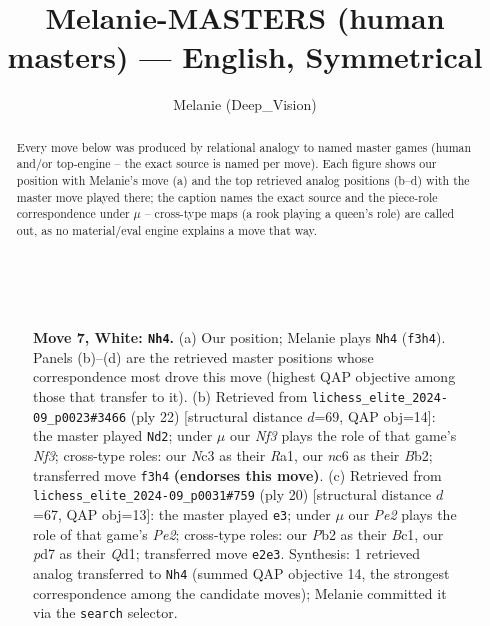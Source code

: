 \documentclass[11pt]{article}
\title{Melanie-MASTERS (human masters) — English, Symmetrical}
\author{Melanie (Deep\_Vision)}
\date{}
\begin{document}
\maketitle

\begin{abstract}Every move below was produced by relational analogy to named master games (human and/or top-engine -- the exact source is named per move). Each figure shows our position with Melanie's move (a) and the top retrieved analog positions (b--d) with the master move played there; the caption names the exact source and the piece-role correspondence under $\mu$ -- cross-type maps (a rook playing a queen's role) are called out, as no material/eval engine explains a move that way.\end{abstract}

\begin{figure}[p]\centering
\begin{subfigure}{0.46\textwidth}\centering
\resizebox{\linewidth}{!}{%
\newchessgame
\chessboard[
  setfen={r1bq1rk1/pp1pppbp/2n2np1/2p5/2P5/2N2NP1/PP1PPPBP/R1BQ1RK1 w - - 4 7},
  showmover=false,
  pgfstyle=straightmove, color=movearrow, markmove={f3-h4}
]}
\caption{}
\end{subfigure}\hfill
\begin{subfigure}{0.46\textwidth}\centering
\resizebox{\linewidth}{!}{%
\newchessgame
\chessboard[
  setfen={r1bq1rk1/1pp1bppp/4pn2/nN1p4/P2P4/5NP1/1BP1PPBP/R2Q1RK1 w - - 3 12},
  showmover=false,
  pgfstyle=straightmove, color=movearrow, markmove={f3-d2}
]}
\caption{}
\end{subfigure}
\\[4pt]
\begin{subfigure}{0.46\textwidth}\centering
\resizebox{\linewidth}{!}{%
\newchessgame
\chessboard[
  setfen={r1bq1rk1/pp2ppbp/1nn3p1/3p4/3P4/2N2NP1/PP2PPBP/R1BQ1RK1 w - - 2 11},
  showmover=false,
  pgfstyle=straightmove, color=movearrow, markmove={e2-e3}
]}
\caption{}
\end{subfigure}\hfill

\caption{\textbf{Move 7, White: \texttt{Nh4}.} (a) Our position; Melanie plays \texttt{Nh4} (\texttt{f3h4}). Panels (b)--(d) are the retrieved master positions whose correspondence most drove this move (highest QAP objective among those that transfer to it). (b) Retrieved from \texttt{lichess\_elite\_2024-09\_p0023\#3466} (ply 22) [structural distance $d$=69, QAP obj=14]: the master played \texttt{Nd2}; under $\mu$ our \emph{Nf3} plays the role of that game's \emph{Nf3}; cross-type roles: our \emph{N}c3 as their \emph{R}a1, our \emph{n}c6 as their \emph{B}b2; transferred move \texttt{f3h4} \textbf{(endorses this move)}. (c) Retrieved from \texttt{lichess\_elite\_2024-09\_p0031\#759} (ply 20) [structural distance $d$=67, QAP obj=13]: the master played \texttt{e3}; under $\mu$ our \emph{Pe2} plays the role of that game's \emph{Pe2}; cross-type roles: our \emph{P}b2 as their \emph{B}c1, our \emph{p}d7 as their \emph{Q}d1; transferred move \texttt{e2e3}. Synthesis: 1 retrieved analog transferred to \texttt{Nh4} (summed QAP objective 14, the strongest correspondence among the candidate moves); Melanie committed it via the \texttt{search} selector.}
\label{fig:thought-m12}
\end{figure}
\end{document}
